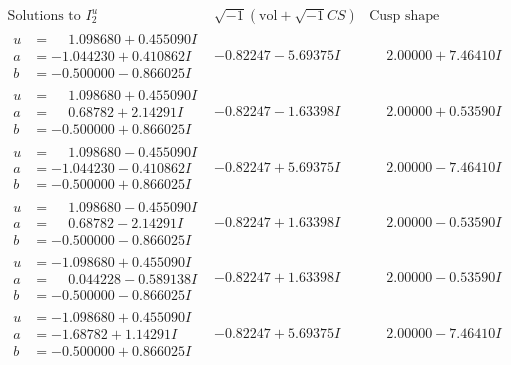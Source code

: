 \documentclass[1p]{elsarticle_modified}
\theoremstyle{definition}
\newcommand{\I}{\sqrt{-1}}
\begin{document}
$$\begin{array}{c|c|c}  
\text{Solutions to }I^u_{2}& \I (\text{vol} + \sqrt{-1}CS) & \text{Cusp shape}\\
 \hline 
\begin{aligned}
u &= \phantom{-}1.098680 + 0.455090 I \\
a &= -1.044230 + 0.410862 I \\
b &= -0.500000 - 0.866025 I\end{aligned}
 & -0.82247 - 5.69375 I & \phantom{-}2.00000 + 7.46410 I \\ \hline\begin{aligned}
u &= \phantom{-}1.098680 + 0.455090 I \\
a &= \phantom{-}0.68782 + 2.14291 I \\
b &= -0.500000 + 0.866025 I\end{aligned}
 & -0.82247 - 1.63398 I & \phantom{-}2.00000 + 0.53590 I \\ \hline\begin{aligned}
u &= \phantom{-}1.098680 - 0.455090 I \\
a &= -1.044230 - 0.410862 I \\
b &= -0.500000 + 0.866025 I\end{aligned}
 & -0.82247 + 5.69375 I & \phantom{-}2.00000 - 7.46410 I \\ \hline\begin{aligned}
u &= \phantom{-}1.098680 - 0.455090 I \\
a &= \phantom{-}0.68782 - 2.14291 I \\
b &= -0.500000 - 0.866025 I\end{aligned}
 & -0.82247 + 1.63398 I & \phantom{-}2.00000 - 0.53590 I \\ \hline\begin{aligned}
u &= -1.098680 + 0.455090 I \\
a &= \phantom{-}0.044228 - 0.589138 I \\
b &= -0.500000 - 0.866025 I\end{aligned}
 & -0.82247 + 1.63398 I & \phantom{-}2.00000 - 0.53590 I \\ \hline\begin{aligned}
u &= -1.098680 + 0.455090 I \\
a &= -1.68782 + 1.14291 I \\
b &= -0.500000 + 0.866025 I\end{aligned}
 & -0.82247 + 5.69375 I & \phantom{-}2.00000 - 7.46410 I \\ \hline\begin{aligned}

\end{aligned}
\end{array}$$
\end{document}
